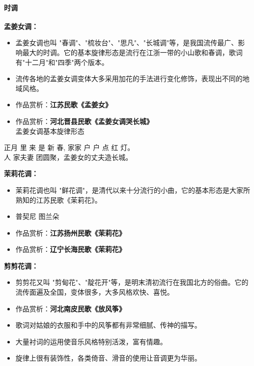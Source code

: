 \documentclass[
]{article}
\providecommand{\tightlist}{%
  \setlength{\itemsep}{0pt}\setlength{\parskip}{0pt}}
\begin{document}
\paragraph{时调}\label{ux65f6ux8c03}

\textbf{孟姜女调：}

\begin{itemize}
\tightlist
\item
  孟姜女调也叫
  "春调"、"梳妆台"、"思凡"、"长城调"等，是我国流传最广、影响最大的时调。它的基本旋律形态是流行在江浙一带的小山歌和春调，歌词有"十二月"和"四季"两个版本。
\item
  流传各地的孟姜女调变体大多采用加花的手法进行变化修饰，表现出不同的地域风格。
\item
  作品赏析：\textbf{江苏民歌《孟姜女》}
\item
  作品赏析：\textbf{河北晋县民歌《孟姜女调哭长城》}\\
  孟姜女调基本旋律形态
\end{itemize}

正月 里 来 是 新 春, 家家 户 户 点 红 灯。\\
人 家夫妻 团圆聚，孟姜女的丈夫造长城。

\textbf{茉莉花调：}

\begin{itemize}
\tightlist
\item
  茉莉花调也叫
  "鲜花调"，是清代以来十分流行的小曲，它的基本形态是大家所熟知的江苏民歌《茉莉花》。
\item
  普契尼 图兰朵
\item
  作品赏析：\textbf{江苏扬州民歌《茉莉花》}
\item
  作品赏析：\textbf{辽宁长海民歌《茉莉花》}
\end{itemize}

\textbf{剪剪花调：}

\begin{itemize}
\tightlist
\item
  剪剪花又叫
  "剪甸花"、"靛花开"等，是明末清初流行在我国北方的俗曲。它的流传面遍及全国，变体很多，大多风格欢快、喜悦。
\item
  作品赏析：\textbf{河北南皮民歌《放风筝》}
\item
  歌词对姑娘的衣服和手中的风筝都有非常细腻、传神的描写。
\item
  大量衬词的运用使音乐风格特别活泼，富有情趣。
\item
  旋律上很有装饰性，各类倚音、滑音的使用让音调更为华丽。
\end{itemize}
\end{document}
